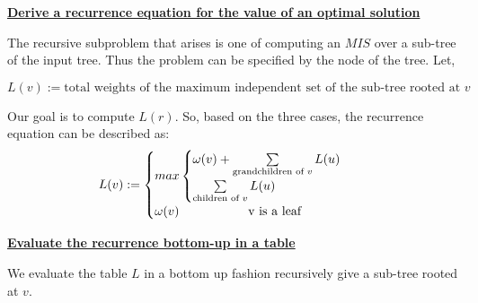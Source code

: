 \documentclass[11pt]{article}
\begin{document}
\begin{enumerate}
  \underline{\textbf{Derive a recurrence equation for the value of an
      optimal solution}}

  The recursive subproblem that arises is one of computing an $MIS$ over
  a sub-tree of the input tree. Thus the problem can be specified
  by the node of the tree. Let,

  \begin{equation}
    L(v) := \text{total weights of the maximum independent set of the
      sub-tree rooted at } v
  \end{equation}

  Our goal is to compute $L(r)$.
  So, based on the three cases, the recurrence equation can be
  described as:
  \begin{equation}
    L(v) := \begin{cases}
      max\begin{cases}
      \omega(v) + \sum\limits_{\text{grandchildren of } v} L(u)\\
      \sum\limits_{\text{children of }v} L(u)\\
      \end{cases}\\
      \omega(v) \-\hspace{5.5em} $v$ \text{ is a leaf} \\
    \end{cases}
  \end{equation}


  \underline{\textbf{Evaluate the recurrence bottom-up in a table}}
  
  We evaluate the table $L$ in a bottom up fashion recursively give a
  sub-tree rooted at $v$. 


\end{enumerate}
\end{document}
